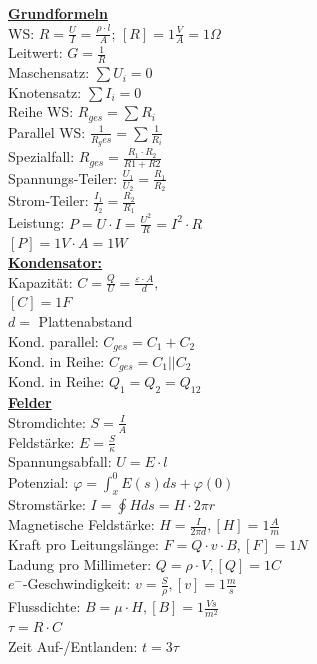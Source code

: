 \documentclass[11pt]{article}
\begin{document}

\begin{minipage}{0.45\textwidth}
\underline{\textbf{Grundformeln}}\\
WS: $R = \frac{U}{I} = \frac{\rho \cdot l}{A}$; $[R] = 1\frac{V}{A} =1 \Omega$ \\
Leitwert: $G = \frac{1}{R}$\\
Maschensatz: $\sum U_i = 0$\\
Knotensatz: $\sum I_i = 0$\\
Reihe WS: $R_{ges} = \sum R_i$\\
Parallel WS: $\frac{1}{R_ges} = \sum \frac{1}{R_i}$\\
\phantom{ss} Spezialfall: $R_{ges} = \frac{R_1 \cdot R_2}{R1+R2} $\\
Spannungs-Teiler: $\frac{U_1}{U_2} = \frac{R_1}{R_2}$\\
Strom-Teiler: $\frac{I_1}{I_2} = \frac{R_2}{R_1}$\\
Leistung: $P =U \cdot I = \frac{U^2}{R} = I^2 \cdot R $ \\
\phantom{ssssssssss} $[P] = 1V \cdot A =1 W$\\
\underline{\textbf{Kondensator:}}\\
Kapazität: $C = \frac{Q}{U} = \frac{\varepsilon \cdot A }{d},$\\
\phantom{ssssssssssii} $[C]=1F$\\
\phantom{sssssssssssii} $d =$ Plattenabstand\\
Kond. parallel: $C_{ges} = C_1 + C_2$\\
Kond. in Reihe: $C_{ges} = C_1 || C_2$\\
Kond. in Reihe: $Q_1 = Q_2 = Q_{12}$\\
\underline{\textbf{Felder}}\\
Stromdichte: $S=\frac{I}{A}$\\
Feldstärke: $E=\frac{S}{\kappa}$\\
Spannungsabfall: $U=E \cdot l$\\
Potenzial: $\varphi = \int_x^0 E(s)ds + \varphi(0)$\\
Stromstärke: $I = \oint H ds = H \cdot 2\pi r$\\
Magnetische Feldstärke: $H = \frac{I}{2\pi d}, [H] = 1\frac{A}{m}$\\
Kraft pro Leitungslänge: $F=Q \cdot v \cdot B, [F] = 1N$\\
Ladung pro Millimeter: $Q = \rho \cdot V, [Q] = 1C$\\
$e^-$-Geschwindigkeit: $v = \frac{S}{\rho}, [v] = 1\frac{m}{s}$\\
Flussdichte: $B=\mu \cdot H, [B] = 1 \frac{Vs}{m^2}$\\


$\tau = R \cdot C$\\
Zeit Auf-/Entlanden: $t = 3\tau$\\

\end{minipage}%
\end{document}

